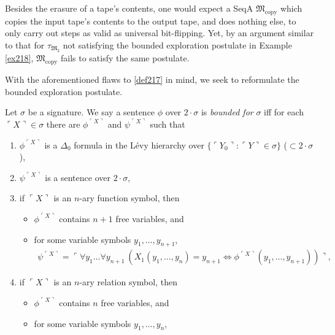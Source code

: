 \documentclass[12pt]{article}
\numberwithin{equation}{section}
\begin{document}
Besides the erasure of a tape's contents, one would expect a SeqA $\mathfrak{M}_{\text{copy}}$ which copies the input tape's contents to the output tape, and does nothing else, to only carry out steps as valid as universal bit-flipping. Yet, by an argument similar to that for $\tau_{\mathfrak{M}_2}$ not satisfying the bounded exploration postulate in Example \ref{ex218}, $\mathfrak{M}_{\text{copy}}$ fails to satisfy the same postulate. 

With the aforementioned flaws to \ref{def217} in mind, we seek to reformulate the bounded exploration postulate.

\begin{defi}\label{def220}
Let $\sigma$ be a signature. We say a sentence $\phi$ over $2 \cdot \sigma$ is \emph{bounded for} $\sigma$ iff for each $\ulcorner X \urcorner \in \sigma$ there are $\phi^{\ulcorner X \urcorner}$ and $\psi^{\ulcorner X \urcorner}$ such that
\begin{enumerate}[label=(\alph*)]
    \item  $\phi^{\ulcorner X \urcorner}$ is a $\Delta_0$ formula in the L\'{e}vy hierarchy over $\{\ulcorner Y_0 \urcorner : \ulcorner Y \urcorner \in \sigma\}$ ($\subset 2 \cdot \sigma$),
    \item $\psi^{\ulcorner X \urcorner}$ is a sentence over $2 \cdot \sigma$,
    \item if $\ulcorner X \urcorner$ is an $n$-ary function symbol, then 
    \begin{itemize}[label=$\circ$, leftmargin=20pt]
        \item $\phi^{\ulcorner X \urcorner}$ contains $n + 1$ free variables, and
        \item for some variable symbols $y_1, \dots, y_{n+1}$,
        \begin{align*}
            \psi^{\ulcorner X \urcorner} = \ulcorner \forall y_1 \dots \forall y_{n+1} \ (X_1(y_1, \dots, y_n) = y_{n+1} \iff \phi^{\ulcorner X \urcorner}(y_1, \dots, y_{n+1})) \urcorner \text{,}
        \end{align*}
    \end{itemize}
    \item if $\ulcorner X \urcorner$ is an $n$-ary relation symbol, then 
    \begin{itemize}[label=$\circ$, leftmargin=20pt]
        \item $\phi^{\ulcorner X \urcorner}$ contains $n$ free variables, and
        \item for some variable symbols $y_1, \dots, y_n$,
        \begin{align*}

\end{align*}
\end{itemize}
\end{enumerate}
\end{defi}
\end{document}
